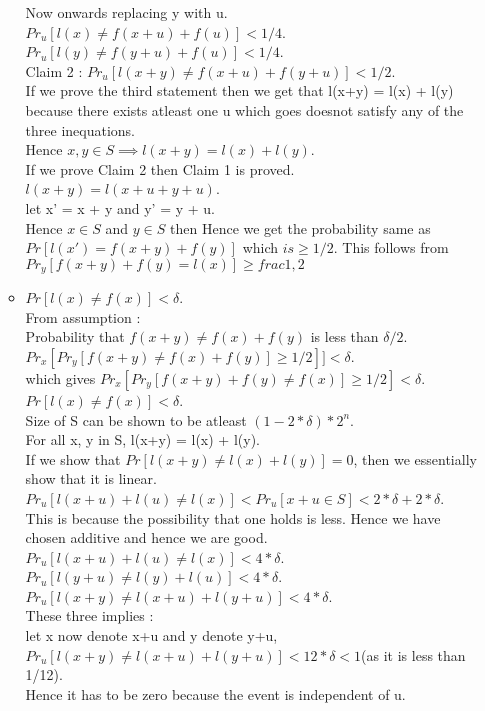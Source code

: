 \documentclass[solution,addpoints,12pt]{exam}
\begin{document}
\begin{parts}
\begin{itemize}
\begin{itemize}
Now onwards replacing y with u.
$Pr_u[l(x) \ne f(x+u) + f(u)] < 1/4$.\\
$Pr_u[l(y) \ne f(y+u) + f(u)] < 1/4$.\\
Claim 2 : $Pr_u[l(x+y) \ne f(x+u) + f(y+u)] < 1/2$.\\
If we prove the third statement then we get that
l(x+y) = l(x) + l(y) because there exists atleast
one u which goes doesnot satisfy any of the three inequations.\\
Hence $x, y \in S \implies l(x+y) = l(x) + l(y)$.\\
If we prove Claim 2 then Claim 1 is proved.
$l(x+y) = l(x + u + y + u)$.\\
let x' = x + y and y' = y + u.\\
Hence $x \in S$ and $y \in S$ then
Hence we get the probability same as
$Pr[l(x') = f(x+y) + f(y)]$ which $is \ge 1/2$. This follows from $Pr_y[f(x+y)+f(y) = l(x)] \ge frac{1,2}$ \\

\item $Pr[l(x) \ne f(x)] < \delta$.\\
From assumption :\\
Probability that $f(x+y) \ne f(x) + f(y)$ is less
than $\delta/2$.\\
$Pr_x[ Pr_y [f(x+y) \ne f(x) + f(y)] \ge 1/2]] < \delta$.\\
which gives $Pr_x[ Pr_y [f(x+y) + f(y) \ne f(x)] \ge 1/2] < \delta$.
$Pr[l(x) \ne f(x)] < \delta$.\\

Size of S can be shown to be atleast $(1 - 2*\delta)*2^n$.\\
For all x, y in S, l(x+y) = l(x) + l(y).\\
If we show that $Pr[l(x+y) \ne l(x) + l(y)] = 0$, then we essentially
show that it is linear.\\
$Pr_u[l(x+u) + l(u) \ne l(x)] < Pr_u[ x + u \in S] < 2*\delta + 2*\delta$.\\
This is because the possibility that one holds is less. Hence we have
chosen additive and hence we are good.\\
$Pr_u[l(x+u) + l(u) \ne l(x)] < 4*\delta$.\\
$Pr_u[l(y+u) \ne l(y) + l(u)] < 4*\delta$.\\
$Pr_u[l(x+y) \ne l(x+u) + l(y+u)] < 4*\delta$.\\
These three implies :\\
let x now denote x+u and y denote y+u,\\
$Pr_u[l(x+y) \ne l(x+u) + l(y+u)] < 12*\delta <  1 $(as it is less than 1/12).\\
Hence it has to be zero because the event is independent of u.\\
\end{itemize}


\end{itemize}
\end{parts}
\end{document}
